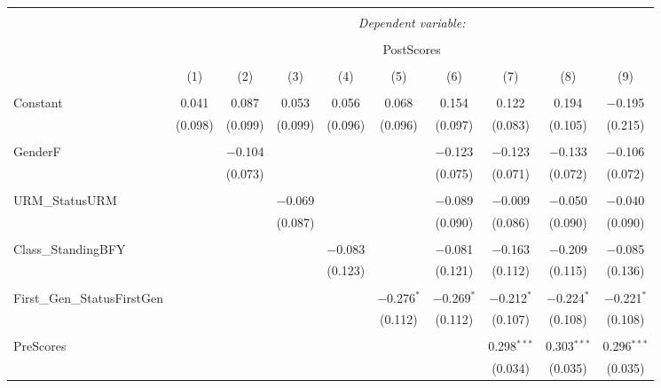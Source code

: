 
\begin{table}[!htbp] \centering 
  \caption{} 
  \label{} 
\begin{tabular}{@{\extracolsep{5pt}}lccccccccc} 
\\[-1.8ex]\hline 
\hline \\[-1.8ex] 
 & \multicolumn{9}{c}{\textit{Dependent variable:}} \\ 
\cline{2-10} 
\\[-1.8ex] & \multicolumn{9}{c}{PostScores} \\ 
\\[-1.8ex] & (1) & (2) & (3) & (4) & (5) & (6) & (7) & (8) & (9)\\ 
\hline \\[-1.8ex] 
 Constant & 0.041 & 0.087 & 0.053 & 0.056 & 0.068 & 0.154 & 0.122 & 0.194 & $-$0.195 \\ 
  & (0.098) & (0.099) & (0.099) & (0.096) & (0.096) & (0.097) & (0.083) & (0.105) & (0.215) \\ 
  & & & & & & & & & \\ 
 GenderF &  & $-$0.104 &  &  &  & $-$0.123 & $-$0.123 & $-$0.133 & $-$0.106 \\ 
  &  & (0.073) &  &  &  & (0.075) & (0.071) & (0.072) & (0.072) \\ 
  & & & & & & & & & \\ 
 URM\_StatusURM &  &  & $-$0.069 &  &  & $-$0.089 & $-$0.009 & $-$0.050 & $-$0.040 \\ 
  &  &  & (0.087) &  &  & (0.090) & (0.086) & (0.090) & (0.090) \\ 
  & & & & & & & & & \\ 
 Class\_StandingBFY &  &  &  & $-$0.083 &  & $-$0.081 & $-$0.163 & $-$0.209 & $-$0.085 \\ 
  &  &  &  & (0.123) &  & (0.121) & (0.112) & (0.115) & (0.136) \\ 
  & & & & & & & & & \\ 
 First\_Gen\_StatusFirstGen &  &  &  &  & $-$0.276$^{*}$ & $-$0.269$^{*}$ & $-$0.212$^{*}$ & $-$0.224$^{*}$ & $-$0.221$^{*}$ \\ 
  &  &  &  &  & (0.112) & (0.112) & (0.107) & (0.108) & (0.108) \\ 
  & & & & & & & & & \\ 
 PreScores &  &  &  &  &  &  & 0.298$^{***}$ & 0.303$^{***}$ & 0.296$^{***}$ \\ 
  &  &  &  &  &  &  & (0.034) & (0.035) & (0.035) \\ 

\end{tabular}
\end{table}
